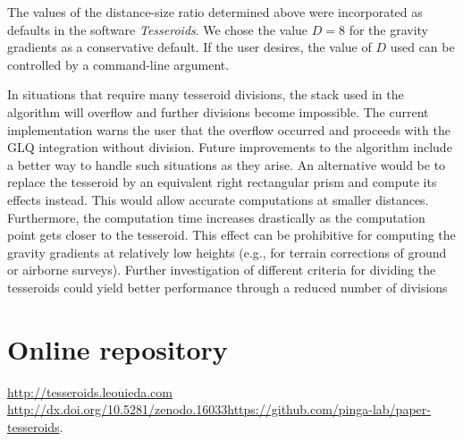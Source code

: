 The values of the distance-size ratio determined above were
incorporated as defaults in the software \emph{Tesseroids}.
We chose the value $D=8$ for the gravity gradients as a conservative default.
If the user desires, the value of $D$ used can be controlled by a command-line
argument.


In situations that require many tesseroid divisions,
the stack used in the algorithm will overflow and further
divisions become impossible.
The current implementation warns the user that
the overflow occurred and proceeds with the GLQ integration without division.
Future improvements to the algorithm include a better way to handle such
situations as they arise.
An alternative would be to replace the tesseroid by an equivalent
right rectangular prism and compute its effects instead.
This would allow accurate computations at smaller distances.
Furthermore,
the computation time increases drastically as the computation point
gets closer to the tesseroid.
This effect can be prohibitive for computing the gravity gradients at
relatively low heights (e.g., for terrain corrections of
ground or airborne surveys).
Further investigation of different criteria for dividing the tesseroids could
yield better performance through a reduced number of divisions\DIFaddbegin {}




\section{Online repository}

\textit{} \url{http://tesseroids.leouieda.com}\textit{} \url{http://dx.doi.org/10.5281/zenodo.16033}\url{https://github.com/pinga-lab/paper-tesseroids}\DIFaddend .
